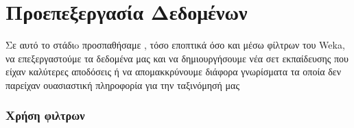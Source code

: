\chapter{Προεπεξεργασία Δεδομένων}
Σε αυτό το στάδιo προσπαθήσαμε , τόσο εποπτικά όσο και μέσω φίλτρων του Weka, να επεξεργαστούμε τα δεδομένα μας και να δημιουργήσουμε νέα σετ εκπαίδευσης που είχαν καλύτερες αποδόσεις ή να απομακκρύνουμε διάφορα γνωρίσματα τα οποία δεν παρείχαν ουασιαστική πληροφορία για την ταξινόμησή μας
\subsection {Χρήση φιλτρων}